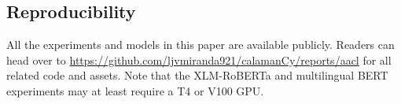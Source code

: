\documentclass[11pt]{article}
\begin{document}
\subsection{Reproducibility}

All the experiments and models in this paper are available publicly. 
Readers can head over to \url{https://github.com/ljvmiranda921/calamanCy/reports/aacl} for all related code and assets.
Note that the XLM-RoBERTa and multilingual BERT experiments may at least require a T4 or V100 GPU.
\end{document}
